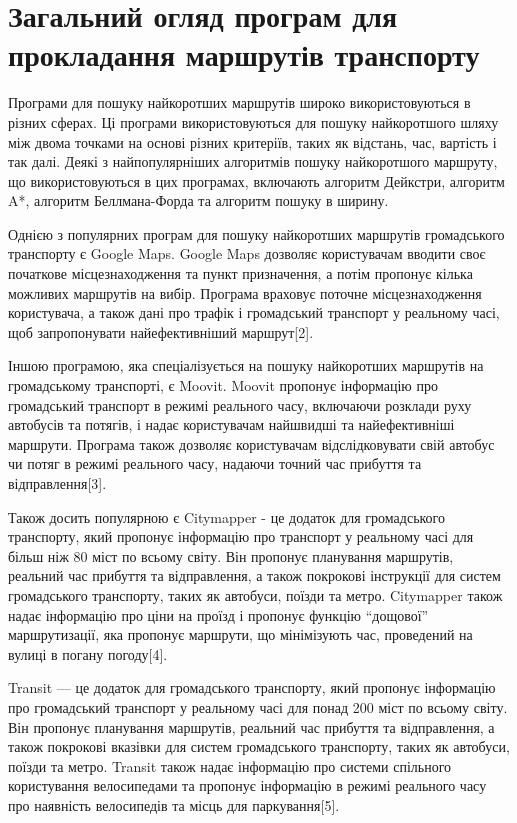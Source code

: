 \section{Загальний огляд програм для прокладання маршрутів транспорту}
\label{sec:existing-sulutions}

Програми для пошуку найкоротших маршрутів широко використовуються в різних сферах. Ці програми використовуються для пошуку найкоротшого шляху між двома точками на основі різних критеріїв, таких як відстань, час, вартість і так далі. Деякі з найпопулярніших алгоритмів пошуку найкоротшого маршруту, що використовуються в цих програмах, включають алгоритм Дейкстри, алгоритм A*, алгоритм Беллмана-Форда та алгоритм пошуку в ширину.

Однією з популярних програм для пошуку найкоротших маршрутів громадського транспорту є Google Maps. Google Maps дозволяє користувачам вводити своє початкове місцезнаходження та пункт призначення, а потім пропонує кілька можливих маршрутів на вибір. Програма враховує поточне місцезнаходження користувача, а також дані про трафік і громадський транспорт у реальному часі, щоб запропонувати найефективніший маршрут[2].

Іншою програмою, яка спеціалізується на пошуку найкоротших маршрутів на громадському транспорті, є Moovit. Moovit пропонує інформацію про громадський транспорт в режимі реального часу, включаючи розклади руху автобусів та потягів, і надає користувачам найшвидші та найефективніші маршрути. Програма також дозволяє користувачам відслідковувати свій автобус чи потяг в режимі реального часу, надаючи точний час прибуття та відправлення[3].

Також досить популярною є Citymapper - це додаток для громадського транспорту, який пропонує інформацію про транспорт у реальному часі для більш ніж 80 міст по всьому світу. Він пропонує планування маршрутів, реальний час прибуття та відправлення, а також покрокові інструкції для систем громадського транспорту, таких як автобуси, поїзди та метро. Citymapper також надає інформацію про ціни на проїзд і пропонує функцію ``дощової'' маршрутизації, яка пропонує маршрути, що мінімізують час, проведений на вулиці в погану погоду[4].

Transit --- це додаток для громадського транспорту, який пропонує інформацію про громадський транспорт у реальному часі для понад 200 міст по всьому світу. Він пропонує планування маршрутів, реальний час прибуття та відправлення, а також покрокові вказівки для систем громадського транспорту, таких як автобуси, поїзди та метро. Transit також надає інформацію про системи спільного користування велосипедами та пропонує інформацію в режимі реального часу про наявність велосипедів та місць для паркування[5].


